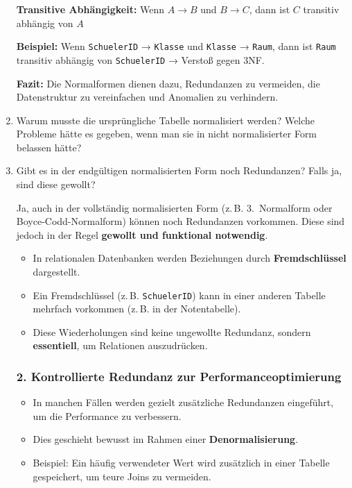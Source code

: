 \documentclass[a4paper,12pt]{article}
\begin{document}
\begin{enumerate}
			\textbf{Transitive Abhängigkeit:}  
			Wenn \( A \rightarrow B \) und \( B \rightarrow C \), dann ist \( C \) transitiv abhängig von \( A \)
			
			\textbf{Beispiel:}  
			Wenn \texttt{SchuelerID} → \texttt{Klasse} und \texttt{Klasse} → \texttt{Raum}, dann ist \texttt{Raum} transitiv abhängig von \texttt{SchuelerID} → Verstoß gegen 3NF.
			
			\vspace{1em}
			
			\textbf{Fazit:}  
			Die Normalformen dienen dazu, Redundanzen zu vermeiden, die Datenstruktur zu vereinfachen und Anomalien zu verhindern.
			
			\item Warum musste die ursprüngliche Tabelle normalisiert werden? Welche Probleme hätte es gegeben, wenn man sie in nicht normalisierter Form belassen hätte?
			\item Gibt es in der endgültigen normalisierten Form noch Redundanzen? Falls ja, sind diese gewollt?

			
			Ja, auch in der vollständig normalisierten Form (z.\,B. 3.\ Normalform oder Boyce-Codd-Normalform) können noch Redundanzen vorkommen. Diese sind jedoch in der Regel \textbf{gewollt und funktional notwendig}.
			
			\begin{itemize}
				\item In relationalen Datenbanken werden Beziehungen durch \textbf{Fremdschlüssel} dargestellt.
				\item Ein Fremdschlüssel (z.\,B. \texttt{SchuelerID}) kann in einer anderen Tabelle mehrfach vorkommen (z.\,B. in der Notentabelle).
				\item Diese Wiederholungen sind keine ungewollte Redundanz, sondern \textbf{essentiell}, um Relationen auszudrücken.
			\end{itemize}
			
			\subsubsection*{2. Kontrollierte Redundanz zur Performanceoptimierung}
			
			\begin{itemize}
				\item In manchen Fällen werden gezielt zusätzliche Redundanzen eingeführt, um die Performance zu verbessern.
				\item Dies geschieht bewusst im Rahmen einer \textbf{Denormalisierung}.
				\item Beispiel: Ein häufig verwendeter Wert wird zusätzlich in einer Tabelle gespeichert, um teure Joins zu vermeiden.
			\end{itemize}
			

\end{enumerate}
\end{document}
